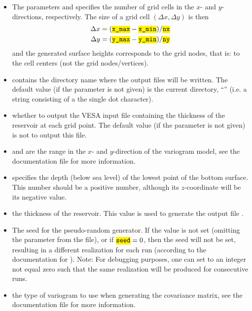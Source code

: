 \documentclass[11pt,a4paper]{amsart}
\begin{document}
\begin{itemize}
  \item The parameters  and   specifies the number
    of grid cells in the $x$- and $y$-directions, respectively. The size of a
    grid cell $(\Delta x, \Delta y)$ is then
    \begin{align*}
      \Delta x = (\jsonParam{x\_max} - \jsonParam{x\_min})/ \jsonParam{nx}\\
      \Delta y = (\jsonParam{y\_max} - \jsonParam{y\_min})/ \jsonParam{ny}
    \end{align*}
    and the generated surface heights corresponds to the grid nodes, that is:
    to the cell centers (not the grid nodes/vertices).

\item {} contains the directory name where the output
  files will be written. The default value (if the parameter is not given) is
  the current directory, ``'' (i.e. a string consisting of a the single
  dot character). 

\item {} whether to output
the VESA input file  containing the thickness of the reservoir at each
  grid point.
  The default value (if the parameter is not given) is not to output this
  file.

\item {} and  are the range in the $x$-
  and $y$-direction of the variogram model, see the documentation file
  \docVariogram{} for more information.

\item {} specifies the depth (below sea level) of
  the lowest point of 
  the bottom surface. This number should be a positive number, although its
  $z$-coordinate will be its negative value.

\item {} the thickness of the reservoir. This
  value is used to generate the output file .

\item {} The seed for the pseudo-random generator. If the value
  is not set (omitting the parameter from the file), or if 
  $\jsonParam{seed} = 0$, then the seed will not be set, resulting in a different
  realization for each run (according to the documentation for
  ). Note: For debugging purposes, one can set
   to an integer not equal zero such that the same realization
  will be produced for consecutive runs.

\item {} the type of variogram to use when
  generating the covariance matrix, see the documentation file
  \docVariogram{} for more information.

\end{itemize}
\end{document}
